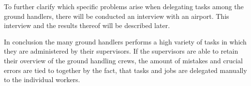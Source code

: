 To further clarify which specific problems arise when delegating tasks among the ground handlers, there will be conducted an interview with an airport. This interview and the results thereof will be described later.

In conclusion the many ground handlers performs a high variety of tasks in which they are administered by their supervisors. If the supervisors are able to retain their overview of the ground handling crews, the amount of mistakes and crucial errors are tied to together by the fact, that tasks and jobs are delegated manually to the individual workers.